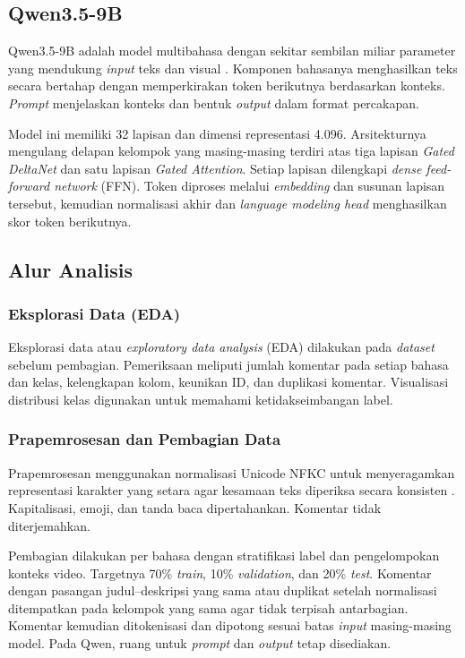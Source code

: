 \documentclass[11pt]{article}
\begin{document}
\subsection{Qwen3.5-9B}
\label{subsec:qwen}

Qwen3.5-9B adalah model multibahasa dengan sekitar sembilan miliar parameter yang mendukung \textit{input} teks dan visual \citep{qwen-team-2026-qwen35}. Komponen bahasanya menghasilkan teks secara bertahap dengan memperkirakan token berikutnya berdasarkan konteks. \textit{Prompt} menjelaskan konteks dan bentuk \textit{output} dalam format percakapan.

Model ini memiliki 32 lapisan dan dimensi representasi 4.096. Arsitekturnya mengulang delapan kelompok yang masing-masing terdiri atas tiga lapisan \textit{Gated DeltaNet} dan satu lapisan \textit{Gated Attention}. Setiap lapisan dilengkapi \textit{dense feed-forward network} (FFN). Token diproses melalui \textit{embedding} dan susunan lapisan tersebut, kemudian normalisasi akhir dan \textit{language modeling head} menghasilkan skor token berikutnya.

\subsection{Alur Analisis}

\subsubsection{Eksplorasi Data (EDA)}
Eksplorasi data atau \textit{exploratory data analysis} (EDA) dilakukan pada \textit{dataset} sebelum pembagian. Pemeriksaan meliputi jumlah komentar pada setiap bahasa dan kelas, kelengkapan kolom, keunikan ID, dan duplikasi komentar. Visualisasi distribusi kelas digunakan untuk memahami ketidakseimbangan label.

\subsubsection{Prapemrosesan dan Pembagian Data}
Prapemrosesan menggunakan normalisasi Unicode NFKC untuk menyeragamkan representasi karakter yang setara agar kesamaan teks diperiksa secara konsisten \citep{unicode-consortium-2026-normalization}. Kapitalisasi, emoji, dan tanda baca dipertahankan. Komentar tidak diterjemahkan.

Pembagian dilakukan per bahasa dengan stratifikasi label dan pengelompokan konteks video. Targetnya 70\% \textit{train}, 10\% \textit{validation}, dan 20\% \textit{test}. Komentar dengan pasangan judul--deskripsi yang sama atau duplikat setelah normalisasi ditempatkan pada kelompok yang sama agar tidak terpisah antarbagian. Komentar kemudian ditokenisasi dan dipotong sesuai batas \textit{input} masing-masing model. Pada Qwen, ruang untuk \textit{prompt} dan \textit{output} tetap disediakan.
\end{document}
